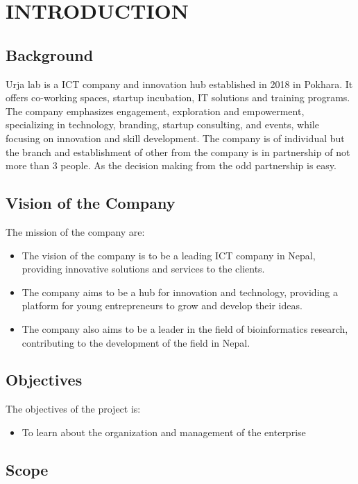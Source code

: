 \setcounter{page}{1}
\chapter{INTRODUCTION}
    \section{Background}
        Urja lab is a ICT company and innovation hub established in 2018 in Pokhara. It offers co-working spaces, startup incubation, IT solutions and training programs. The company emphasizes engagement, exploration and empowerment, specializing in technology, branding, startup consulting, and events, while focusing on innovation and skill development. The company is of individual but the branch and establishment of other from the company is in partnership of not more than 3 people. As the decision making from the odd partnership is easy.

    \section{Vision of the Company} 
    The mission of the company are:
  \begin{itemize}
    \item The vision of the company is to be a leading ICT company in Nepal, providing innovative solutions and services to the clients.
    \item The company aims to be a hub for innovation and technology, providing a platform for young entrepreneurs to grow and develop their ideas.
    \item The company also aims to be a leader in the field of bioinformatics research, contributing to the development of the field in Nepal.

  \end{itemize}  
    
    
    \section{Objectives}
    The objectives of the project is:
        \begin{itemize}
        \setlength\itemsep{1.5pt}
        \item To learn about the organization and management of the enterprise

        \end{itemize}


    \section{Scope}
    
